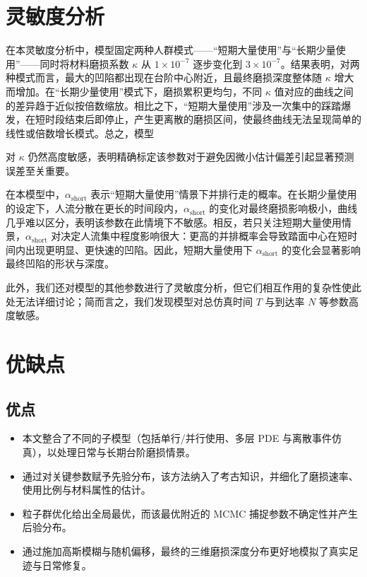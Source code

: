 \documentclass[11pt,a4paper,fontset=windows]{ctexart}
\begin{document}
\section{灵敏度分析}

在本灵敏度分析中，模型固定两种人群模式——“短期大量使用”与“长期少量使用”——同时将材料磨损系数 $\kappa$ 从 $1\times10^{-7}$ 逐步变化到 $3\times10^{-7}$。结果表明，对两种模式而言，最大的凹陷都出现在台阶中心附近，且最终磨损深度整体随 $\kappa$ 增大而增加。在“长期少量使用”模式下，磨损累积更均匀，不同 $\kappa$ 值对应的曲线之间的差异趋于近似按倍数缩放。相比之下，“短期大量使用”涉及一次集中的踩踏爆发，在短时段结束后即停止，产生更离散的磨损区间，使最终曲线无法呈现简单的线性或倍数增长模式。总之，模型

对 $\kappa$ 仍然高度敏感，表明精确标定该参数对于避免因微小估计偏差引起显著预测误差至关重要。

在本模型中，$\alpha_{\text{short}}$ 表示“短期大量使用”情景下并排行走的概率。在长期少量使用的设定下，人流分散在更长的时间段内，$\alpha_{\text{short}}$ 的变化对最终磨损影响极小，曲线几乎难以区分，表明该参数在此情境下不敏感。相反，若只关注短期大量使用情景，$\alpha_{\text{short}}$ 对决定人流集中程度影响很大：更高的并排概率会导致踏面中心在短时间内出现更明显、更快速的凹陷。因此，短期大量使用下 $\alpha_{\text{short}}$ 的变化会显著影响最终凹陷的形状与深度。

此外，我们还对模型的其他参数进行了灵敏度分析，但它们相互作用的复杂性使此处无法详细讨论；简而言之，我们发现模型对总仿真时间 $T$ 与到达率 $N$ 等参数高度敏感。

\section{优缺点}

\subsection{优点}
\begin{itemize}
\item 本文整合了不同的子模型（包括单行/并行使用、多层 PDE 与离散事件仿真），以处理日常与长期台阶磨损情景。
\item 通过对关键参数赋予先验分布，该方法纳入了考古知识，并细化了磨损速率、使用比例与材料属性的估计。
\item 粒子群优化给出全局最优，而该最优附近的 MCMC 捕捉参数不确定性并产生后验分布。
\item 通过施加高斯模糊与随机偏移，最终的三维磨损深度分布更好地模拟了真实足迹与日常修复。
\end{itemize}
\end{document}
